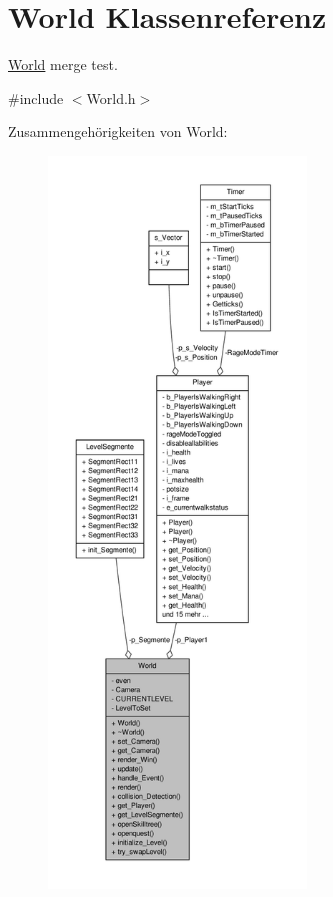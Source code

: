 \hypertarget{class_world}{\section{World Klassenreferenz}
\label{class_world}
}


\hyperlink{class_world}{World} merge test.  




{\ttfamily \#include $<$World.\-h$>$}



Zusammengehörigkeiten von World\-:
\nopagebreak
\begin{figure}[H]
\begin{center}
\leavevmode
\includegraphics[height=550pt]{class_world__coll__graph}
\end{center}
\end{figure}
